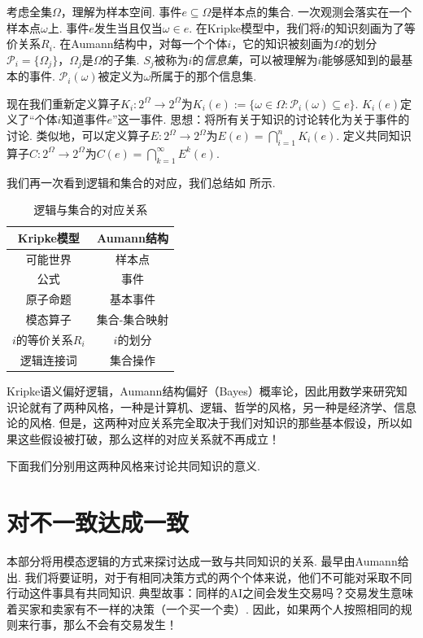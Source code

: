 考虑全集$\Omega$，理解为样本空间. 事件$e\subseteq \Omega$是样本点的集合. 一次观测会落实在一个样本点$\omega$上. 事件$e$发生当且仅当$\omega\in e$. 在Kripke模型中，我们将$i$的知识刻画为了等价关系$R_i$. 在Aumann结构中，对每一个个体$i$，它的知识被刻画为$\Omega$的划分$\mathcal P_i=\{\Omega_j\}$，$\Omega_j$是$\Omega$的子集. $S_j$被称为$i$的\emph{信息集}，可以被理解为$i$能够感知到的最基本的事件. $\mathcal P_i(\omega)$被定义为$\omega$所属于的那个信息集. 

现在我们重新定义算子$K_i:2^\Omega\to 2^\Omega$为$K_i(e):=\{\omega\in\Omega:\mathcal P_i(\omega)\subseteq e\}$. $K_i(e)$定义了“个体$i$知道事件$e$”这一事件. 思想：将所有关于知识的讨论转化为关于事件的讨论. 类似地，可以定义算子$E:2^\Omega\to 2^\Omega$为$E(e)=\bigcap_{i=1}^n K_i(e)$. 定义共同知识算子$C:2^\Omega\to 2^\Omega$为$C(e)=\bigcap_{k=1}^\infty E^k(e)$.

我们再一次看到逻辑和集合的对应，我们总结如 所示.
\begin{table}[ht]
    \centering
    \begin{tabular}{cc}
    \toprule
            Kripke模型&Aumann结构  \\\midrule
            可能世界&样本点\\
            公式&事件\\
            原子命题&基本事件\\
            模态算子&集合-集合映射\\
            $i$的等价关系$R_i$&$i$的划分\\
            逻辑连接词&集合操作\\\bottomrule
    \end{tabular}
    \caption{逻辑与集合的对应关系}
    \label{tab:logic-set-correspondence}
\end{table}

Kripke语义偏好逻辑，Aumann结构偏好（Bayes）概率论，因此用数学来研究知识论就有了两种风格，一种是计算机、逻辑、哲学的风格，另一种是经济学、信息论的风格. 但是，这两种对应关系完全取决于我们对知识的那些基本假设，所以如果这些假设被打破，那么这样的对应关系就不再成立！

下面我们分别用这两种风格来讨论共同知识的意义.


\section{对不一致达成一致}

本部分将用模态逻辑的方式来探讨达成一致与共同知识的关系. 最早由Aumann给出. 我们将要证明，对于有相同决策方式的两个个体来说，他们不可能对采取不同行动这件事具有共同知识. 典型故事：同样的AI之间会发生交易吗？交易发生意味着买家和卖家有不一样的决策（一个买一个卖）. 因此，如果两个人按照相同的规则来行事，那么不会有交易发生！

